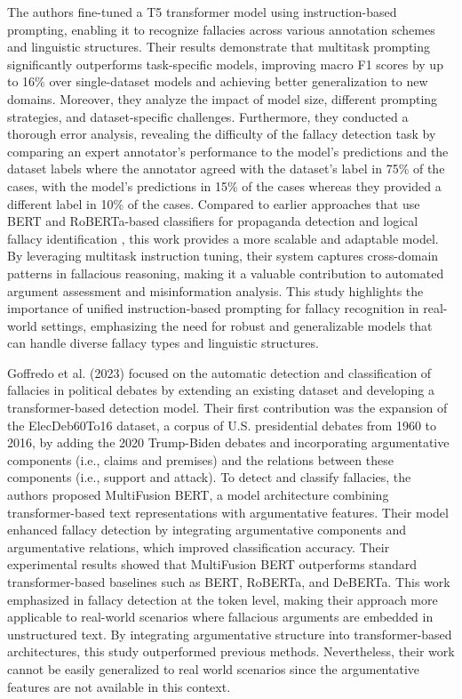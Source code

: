 The authors fine-tuned a T5 transformer model \cite{raffel2020exploring} using instruction-based prompting, enabling it to recognize fallacies across various annotation schemes and linguistic structures. Their results demonstrate that multitask prompting significantly outperforms task-specific models, improving macro F1 scores by up to 16\% over single-dataset models and achieving better generalization to new domains. Moreover, they analyze the impact of model size, different prompting strategies, and dataset-specific challenges. Furthermore, they conducted a thorough error analysis, revealing the difficulty of the fallacy detection task by comparing an expert annotator's performance to the model's predictions and the dataset labels where the annotator agreed with the dataset's label in 75\% of the cases, with the model's predictions in 15\% of the cases whereas they provided a different label in 10\% of the cases.
Compared to earlier approaches that use BERT and RoBERTa-based classifiers for propaganda detection \cite{dasanmartinoFineGrainedAnalysisPropaganda2019} and logical fallacy identification \cite{jinLogicalFallacyDetection2022}, this work provides a more scalable and adaptable model. By leveraging multitask instruction tuning, their system captures cross-domain patterns in fallacious reasoning, making it a valuable contribution to automated argument assessment and misinformation analysis.
This study highlights the importance of unified instruction-based prompting for fallacy recognition in real-world settings, emphasizing the need for robust and generalizable models that can handle diverse fallacy types and linguistic structures.
\par
Goffredo et al. (2023) \cite{goffredoArgumentbasedDetectionClassification2023} focused on the automatic detection and classification of fallacies in political debates by extending an existing dataset and developing a transformer-based detection model.
Their first contribution was the expansion of the ElecDeb60To16 dataset, a corpus of U.S. presidential debates from 1960 to 2016, by adding the 2020 Trump-Biden debates and incorporating argumentative components (i.e., claims and premises) and the relations between these components (i.e., support
and attack). To detect and classify fallacies, the authors proposed MultiFusion BERT, a model architecture combining transformer-based text representations with argumentative features. Their model enhanced fallacy detection by integrating argumentative components and argumentative relations, which improved classification accuracy. Their experimental results showed that MultiFusion BERT outperforms standard transformer-based baselines such as BERT, RoBERTa, and DeBERTa.
This work emphasized in fallacy detection at the token level, making their approach more applicable to real-world scenarios where fallacious arguments are embedded in unstructured text.
By integrating argumentative structure into transformer-based architectures, this study outperformed previous methods. Nevertheless, their work cannot be easily generalized to real world scenarios since the argumentative features are not available in this context.
\par

